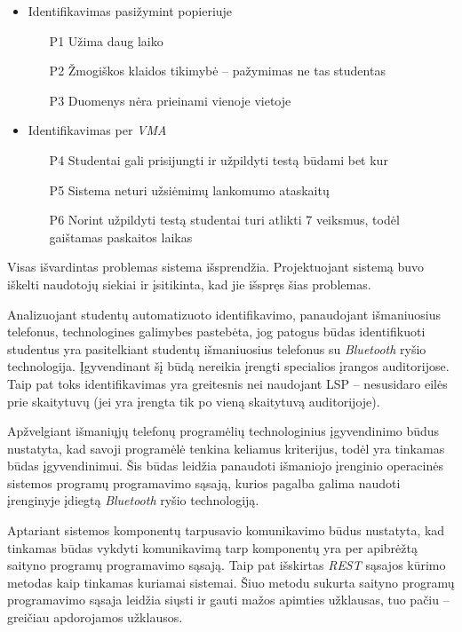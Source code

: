 \documentclass{VUMIFPSbakalaurinis}
\begin{document}
\begin{itemize}
    \item Identifikavimas pasižymint popieriuje
    \begin{itemize}
        \item[P1] Užima daug laiko
        \item[P2] Žmogiškos klaidos tikimybė – pažymimas ne tas studentas
        \item[P3] Duomenys nėra prieinami vienoje vietoje
    \end{itemize}
    \item Identifikavimas per \textit{VMA}
    \begin{itemize}
        \item[P4] Studentai gali prisijungti ir užpildyti testą būdami bet kur
        \item[P5] Sistema neturi užsiėmimų lankomumo ataskaitų
        \item[P6] Norint užpildyti testą studentai turi atlikti 7 veiksmus, todėl gaištamas paskaitos laikas
    \end{itemize}
\end{itemize}

Visas išvardintas problemas sistema išsprendžia. Projektuojant sistemą buvo iškelti naudotojų siekiai ir įsitikinta, kad jie išspręs šias problemas.

Analizuojant studentų automatizuoto identifikavimo, panaudojant išmaniuosius telefonus, technologines galimybes pastebėta, jog patogus būdas identifikuoti studentus yra pasitelkiant studentų išmaniuosius telefonus su \textit{Bluetooth} ryšio technologija. Įgyvendinant šį būdą nereikia įrengti specialios įrangos auditorijose. Taip pat toks identifikavimas yra greitesnis nei naudojant LSP – nesusidaro eilės prie skaitytuvų (jei yra įrengta tik po vieną skaitytuvą auditorijoje).

Apžvelgiant išmaniųjų telefonų programėlių technologinius įgyvendinimo būdus nustatyta, kad savoji programėlė tenkina keliamus kriterijus, todėl yra tinkamas būdas įgyvendinimui. Šis būdas leidžia panaudoti išmaniojo įrenginio operacinės sistemos programų programavimo sąsają, kurios pagalba galima naudoti įrenginyje įdiegtą \textit{Bluetooth} ryšio technologiją.

Aptariant sistemos komponentų tarpusavio komunikavimo būdus nustatyta, kad tinkamas būdas vykdyti komunikavimą tarp komponentų yra per apibrėžtą saityno programų programavimo sąsają. Taip pat išskirtas \textit{REST} sąsajos kūrimo metodas kaip tinkamas kuriamai sistemai. Šiuo metodu sukurta saityno programų programavimo sąsaja leidžia siųsti ir gauti mažos apimties užklausas, tuo pačiu – greičiau apdorojamos užklausos.
\end{document}

